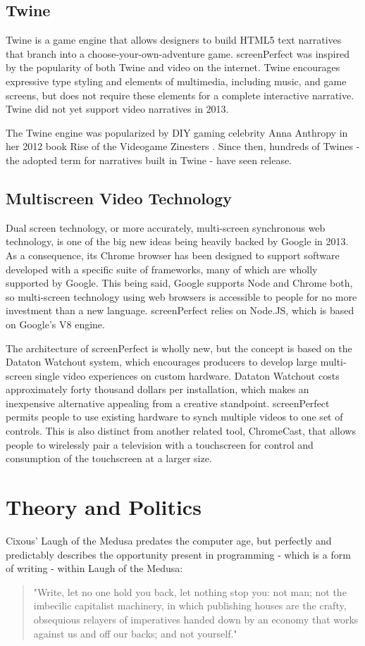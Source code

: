 \subsection{Twine}
Twine is a game engine that allows designers to build HTML5 text narratives that branch into a choose-your-own-adventure game. screenPerfect was inspired by the popularity of both Twine and video on the internet. Twine encourages expressive type styling and elements of multimedia, including music, and game screens, but does not require these elements for a complete interactive narrative. Twine did not yet support video narratives in 2013.

The Twine engine was popularized by DIY gaming celebrity Anna Anthropy in her 2012 book Rise of the Videogame Zinesters \parencite{anthropy}. Since then, hundreds of Twines - the adopted term for narratives built in Twine - have seen release.

\subsection{Multiscreen Video Technology}
Dual screen technology, or more accurately, multi-screen synchronous web technology, is one of the big new ideas being heavily backed by Google in 2013. As a consequence, its Chrome browser has been designed to support software developed with a specific suite of frameworks, many of which are wholly supported by Google. 
This being said, Google supports Node and Chrome both, so multi-screen technology using web browsers is accessible to people for no more investment than a new language. screenPerfect relies on Node.JS, which is based on Google's V8 engine.

The architecture of screenPerfect is wholly new, but the concept is based on the Dataton Watchout system, which encourages producers to develop large multi-screen single video experiences on custom hardware. Dataton Watchout costs approximately forty thousand dollars per installation, which makes an inexpensive alternative appealing from a creative standpoint. screenPerfect permits people to use existing hardware to synch multiple videos to one set of controls. This is also distinct from another related tool, ChromeCast, that allows people to wirelessly pair a television with a touchscreen for control and consumption of the touchscreen at a larger size.

\section{Theory and Politics}
Cixous' Laugh of the Medusa predates the computer age, but perfectly and predictably describes the opportunity present in programming - which is a form of writing - within Laugh of the Medusa:
\begin{quote}
"Write, let no one hold you back, let nothing stop you: not man; not the imbecilic capitalist machinery, in which publishing houses are the crafty, obsequious relayers of imperatives handed down by an economy that works against us and off our backs; and not yourself." 
\textit{\parencite{cixous}}
\end{quote}

